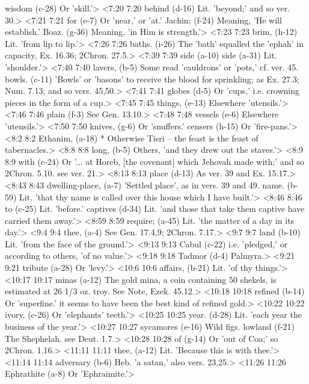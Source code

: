   wisdom (c-28)  Or 'skill.'>
<7:20 7:20  behind (d-16)  Lit. 'beyond;' and so ver. 30.>
<7:21 7:21  for (e-7)  Or 'near,' or 'at.'
  Jachin; (f-24)  Meaning, 'He will establish.'
  Boaz. (g-36)  Meaning, 'in Him is strength.'>
<7:23 7:23  brim, (h-12)  Lit. 'from lip to lip.'>
<7:26 7:26  baths. (i-26)  The 'bath' equalled the 'ephah' in capacity, Ex. 16.36;  2Chron. 27.5.>
<7:39 7:39  side (a-10)  side (a-31)
  Lit. 'shoulder.'>
<7:40 7:40  lavers, (b-5)  Some read 'cauldrons' or 'pots,' cf. ver. 45.
  bowls. (c-11)  'Bowls' or 'basons' to receive the blood for sprinkling; as  Ex. 27.3; Num. 7.13; and so vers. 45,50.>
<7:41 7:41  globes (d-5)  Or 'cups,' i.e. crowning pieces in the form of a cup.>
<7:45 7:45  things, (e-13) Elsewhere 'utensils.'>
<7:46 7:46  plain (f-3)  See Gen. 13.10.>
<7:48 7:48  vessels (e-6)  Elsewhere 'utensils.'>
<7:50 7:50  knives, (g-6)  Or 'snuffers.'
  censers (h-15)  Or 'fire-pans.'>
<8:2 8:2  Ethanim, (a-18)  * Otherwise Tisri -- the feast is the feast of tabernacles.>
<8:8 8:8  long, (b-5)  Others, 'and they drew out the staves.'>
<8:9 8:9  with (c-24)  Or '... at Horeb, [the covenant] which Jehovah made with;'  and so 2Chron. 5.10. see ver. 21.>
<8:13 8:13  place (d-13)  As ver. 39 and Ex. 15.17.>
<8:43 8:43  dwelling-place, (a-7)  'Settled place', as in vers. 39 and 49.
  name. (b-59)  Lit. 'that thy name is called over this house which I have  built.'>
<8:46 8:46  to (c-25)  Lit. 'before.'  captives (d-34)  Lit. 'and those that take them captive have carried them  away.'>
<8:59 8:59  require; (a-45)  Lit. 'the matter of a day in its day.'>
<9:4 9:4  thee, (a-4)  See Gen. 17.4,9; 2Chron. 7.17.>
<9:7 9:7  land (b-10)  Lit. 'from the face of the ground.'>
<9:13 9:13  Cabul (c-22)  i.e. 'pledged,' or according to others, 'of no value.'>
<9:18 9:18  Tadmor (d-4)  Palmyra.>
<9:21 9:21  tribute (a-28)  Or 'levy.'>
<10:6 10:6  affairs, (b-21)  Lit. 'of thy things.'>
<10:17 10:17  minas (a-12)  The gold mina, a coin containing 50 shekels, is estimated at  26 1/3 oz. troy. See Note, Ezek. 45.12.>
<10:18 10:18  refined (b-14)  Or 'superfine.' it seems to have been the best kind of  refined gold.>
<10:22 10:22  ivory, (c-26)  Or 'elephants' teeth.'>
<10:25 10:25  year. (d-28)  Lit. 'each year the business of the year.'>
<10:27 10:27  sycamores (e-16)  Wild figs.
  lowland (f-21)  The Shephelah. see Deut. 1.7.>
<10:28 10:28  of (g-14)  Or 'out of Coa;' so 2Chron. 1.16.>
<11:11 11:11  thee, (a-12)  Lit. 'Because this is with thee.'>
<11:14 11:14  adversary (b-6)  Heb. 'a satan,' also vers. 23,25.>
<11:26 11:26  Ephrathite (a-8)  Or 'Ephraimite.'>
